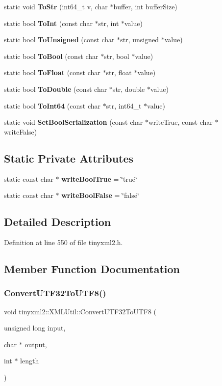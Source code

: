 \begin{DoxyCompactItemize}
\item 
static void \textbf{ To\+Str} (int64\+\_\+t v, char $\ast$buffer, int buffer\+Size)
\item 
static bool \textbf{ To\+Int} (const char $\ast$str, int $\ast$value)
\item 
static bool \textbf{ To\+Unsigned} (const char $\ast$str, unsigned $\ast$value)
\item 
static bool \textbf{ To\+Bool} (const char $\ast$str, bool $\ast$value)
\item 
static bool \textbf{ To\+Float} (const char $\ast$str, float $\ast$value)
\item 
static bool \textbf{ To\+Double} (const char $\ast$str, double $\ast$value)
\item 
static bool \textbf{ To\+Int64} (const char $\ast$str, int64\+\_\+t $\ast$value)
\item 
static void \textbf{ Set\+Bool\+Serialization} (const char $\ast$write\+True, const char $\ast$write\+False)
\end{DoxyCompactItemize}
\subsection*{Static Private Attributes}
\begin{DoxyCompactItemize}
\item 
static const char $\ast$ \textbf{ write\+Bool\+True} = \char`\"{}true\char`\"{}
\item 
static const char $\ast$ \textbf{ write\+Bool\+False} = \char`\"{}false\char`\"{}
\end{DoxyCompactItemize}


\subsection{Detailed Description}


Definition at line 550 of file tinyxml2.\+h.



\subsection{Member Function Documentation}
\mbox{\label{classtinyxml2_1_1_x_m_l_util_a31c00d5c5dfb38382de1dfcaf4be3595}} 
\subsubsection{ConvertUTF32ToUTF8()}
{\footnotesize\ttfamily void tinyxml2\+::\+X\+M\+L\+Util\+::\+Convert\+U\+T\+F32\+To\+U\+T\+F8 (\begin{DoxyParamCaption}\item[{unsigned long}]{input,  }\item[{char $\ast$}]{output,  }\item[{int $\ast$}]{length }\end{DoxyParamCaption})\hspace{0.3cm}{\ttfamily [static]}}



